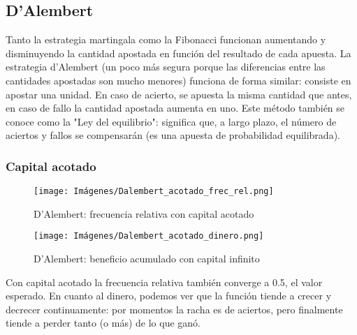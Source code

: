 \documentclass{article}
\begin{document}
\subsection{D'Alembert}
Tanto la estrategia martingala como la Fibonacci funcionan aumentando y disminuyendo la cantidad apostada en función
del resultado de cada apuesta. La estrategia d’Alembert (un poco más segura porque las diferencias entre las cantidades apostadas son mucho menores) funciona de forma similar: consiste en apostar una unidad. En caso de acierto, se apuesta la misma cantidad que antes, en caso de fallo la cantidad apostada aumenta en uno. Este método también se conoce como la "Ley del equilibrio": significa que, a largo plazo, el número de aciertos y fallos se compensarán (es una apuesta de probabilidad equilibrada).

\subsubsection{Capital acotado}
\begin{figure*}[!htb]
   \begin{minipage}{0.48\textwidth}
     \centering
     \texttt{[image: Imágenes/Dalembert\_acotado\_frec\_rel.png]}
     \caption*{D'Alembert: frecuencia relativa con capital acotado}\label{Fig:Data1}
   \end{minipage}\hfill
   \begin{minipage}{0.48\textwidth}
     \centering
     \texttt{[image: Imágenes/Dalembert\_acotado\_dinero.png]}
     \caption*{D'Alembert: beneficio acumulado con capital infinito}\label{Fig:Data2}
   \end{minipage}
\end{figure*}
Con capital acotado la frecuencia relativa también converge a 0.5, el valor esperado. En cuanto al dinero, podemos ver que la función tiende a crecer y decrecer continuamente: por momentos la racha es de aciertos, pero finalmente tiende a perder tanto (o más) de lo que ganó. 
\end{document}
